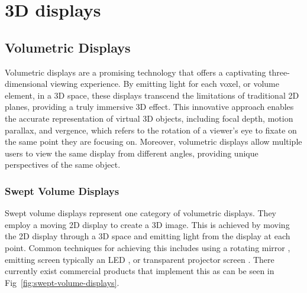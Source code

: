 \section{3D displays}

\subsection{Volumetric Displays}
Volumetric displays \cite{1492264} are a promising technology that offers a captivating three-dimensional viewing experience. By emitting light for each voxel, or volume element, in a 3D space, these displays transcend the limitations of traditional 2D planes, providing a truly immersive 3D effect. This innovative approach enables the accurate representation of virtual 3D objects, including focal depth, motion parallax, and vergence, which refers to the rotation of a viewer's eye to fixate on the same point they are focusing on. Moreover, volumetric displays allow multiple users to view the same display from different angles, providing unique perspectives of the same object.

\subsubsection{Swept Volume Displays}
Swept volume displays represent one category of volumetric displays. They employ a moving 2D display to create a 3D image. This is achieved by moving the 2D display through a 3D space and emitting light from the display at each point. Common techniques for achieving this includes using a rotating mirror \cite{10.1117/12.480930}, emitting screen typically an LED \cite{Gately:11}, or transparent projector screen \cite{keane_volumetric_2016}. There currently exist commercial products that implement this as can be seen in Fig~\ref{fig:swept-volume-displays}.

